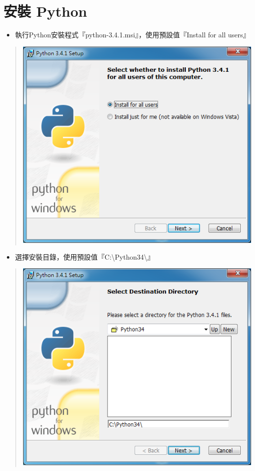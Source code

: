 \documentclass[letterpaper,10pt,english]{sphinxmanual}
\begin{document}
\section{安裝 Python}
\label{_doc/sphinx-doc-win/index:id3}\begin{itemize}
\item {} 
執行Python安裝程式『python-3.4.1.msi』，使用預設值『Install for all users』

\end{itemize}
\begin{quote}

\includegraphics{Python-Install-001.png}
\end{quote}
\begin{itemize}
\item {} 
選擇安裝目錄，使用預設值『C:\textbackslash{}Python34\textbackslash{}』

\end{itemize}
\begin{quote}

\includegraphics{Python-Install-002.png}
\end{quote}
\end{document}
